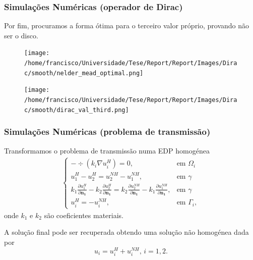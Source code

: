 \documentclass[portuguese,notheorems]{beamer}
\begin{document}
\begin{frame}\frametitle{Simulações Numéricas (operador de Dirac)}
    Por fim, procuramos a forma ótima para o terceiro valor próprio, provando não ser o disco.
    \begin{figure}
    \centering
    \begin{minipage}{.56\textwidth}
        \centering
        \texttt{[image: /home/francisco/Universidade/Tese/Report/Report/Images/Dirac/smooth/nelder\_mead\_optimal.png]}
        \captionsetup{width=0.8\linewidth} %
        \label{dirac_nelder_mead_domain}
    \end{minipage}%
    \begin{minipage}{.56\textwidth}
        \centering
        \texttt{[image: /home/francisco/Universidade/Tese/Report/Report/Images/Dirac/smooth/dirac\_val\_third.png]}
        \captionsetup{width=0.8\linewidth} %
        \label{dirac_val_third}
    \end{minipage}
\end{figure}
\end{frame}

\begin{frame}\frametitle{Simulações Numéricas (problema de transmissão)}
    Transformamos o problema de transmissão numa EDP homogénea
    \begin{align}
        \begin{cases}
        - \div \left(k_i \nabla u_i^H\right)  = 0, & \text{em }\Omega_i\\
        u_1^H - u_2^H = u_2^{NH}- u_1^{NH}, & \text{em }\gamma\\
        k_1 \frac{\partial u_1^H}{\partial \mathbf{n_1}} - k_2 \frac{\partial u_2^H}{\partial  \mathbf{n_1}} = k_2 \frac{\partial u_2^{NH}}{\partial  \mathbf{n_1}}  - k_1 \frac{\partial u_1^{NH}}{\partial  \mathbf{n_1}}, & \text{em }\gamma\\
        u_i^H = - u_i^{NH}, & \text{em }\Gamma_i,
        \end{cases}
    \end{align}
    onde $k_1$ e $k_2$ são coeficientes materiais.
    \pause

    A solução final pode ser recuperada obtendo uma solução não homogénea dada por
    \[u_i = u_i^H + u_i^{NH}, \, i = 1, 2.\]
\end{frame}
\end{document}
